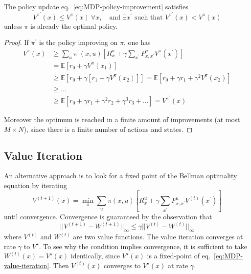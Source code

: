 \begin{theorem}
  The policy update eq.~\eqref{eq:MDP-policy-improvement} satisfies
  \begin{equation*}
    V^{\pi^\prime}(x) \le V^\pi(x)\ \forall x,\quad \text{and }\exists x^\prime \text{ such that }V^{\pi^\prime}(x) < V^\pi(x)
  \end{equation*}
  unless $\pi$ is already the optimal policy.
\end{theorem}
\begin{proof}
  If $\pi^\prime$ is the policy improving on $\pi$, one has
  \begin{align*}
    V^\pi(x) &\ge \sum_u \pi^\prime(x,u)\left[R^u_x + \gamma \sum_{x^\prime}P^u_{x,x^\prime} V^\pi(x^\prime)\right] \\
             &= \mathbb{E} \left[r_0 + \gamma V^\pi(x_1)\right] \\
             &\ge \mathbb{E} \left[r_0 + \gamma \left[r_1 + \gamma V^\pi(x_2)\right]\right] = \mathbb{E} \left[r_0 + \gamma r_1 + \gamma^2 V^\pi(x_2)\right] \\
             &\ge \ldots \\
             &\ge \mathbb{E} \left[r_0 + \gamma r_1 + \gamma^2 r_2 + \gamma^3 r_3 + \ldots \right] = V^{\pi^\prime}(x)
  \end{align*}

  Moreover the optimum is reached in a finite amount of improvements (at most $M\times N$), since there is a finite number of actions and states.
\end{proof}

\subsection{Value Iteration}
\label{sec:MDP-value-iteration}

An alternative approach is to look for a fixed point of the Bellman optimality equation by iterating
\begin{equation}
  \label{eq:MDP-value-iteration}
  V^{(t+1)}(x) = \min_\pi  \sum_u \pi(x,u)\left[R^u_x + \gamma \sum_{x^\prime}P^u_{x,x^\prime} V^{(t)}(x^\prime)\right]
\end{equation}
until convergence. Convergence is guaranteed by the observation that
\begin{equation*}
  ||V^{(t+1)}-W^{(t+1)}||_\infty \le \gamma ||V^{(t)}-W^{(t)}||_\infty
\end{equation*}
where $V^{(t)}$ and $W^{(t)}$ are two value functions. The value iteration converges at rate $\gamma$ to $V^\star$. To see why the condition implies convergence, it is sufficient to take $W^{(t)}(x) = V^\star(x)$ identically, since $V^\star(x)$ is a fixed-point of eq.~\eqref{eq:MDP-value-iteration}. Then $V^{(t)}(x)$ converges to $V^\star(x)$ at rate $\gamma$.

